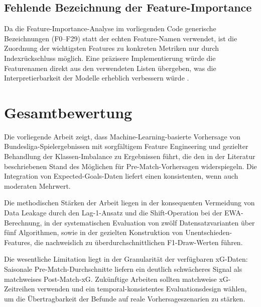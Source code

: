 \subsection{Fehlende Bezeichnung der Feature-Importance}

Da die Feature-Importance-Analyse im vorliegenden Code generische
Bezeichnungen (F0--F29) statt der echten Feature-Namen verwendet, ist
die Zuordnung der wichtigsten Features zu konkreten Metriken nur durch
Indexrückschluss möglich. Eine präzisere Implementierung würde die
Featurenamen direkt aus den verwendeten Listen übergeben, was die
Interpretierbarkeit der Modelle erheblich verbessern würde
\cite{LundbergLee2017}.

\section{Gesamtbewertung}
\label{sec:disk-zusammenfassung}

Die vorliegende Arbeit zeigt, dass Machine-Learning-basierte Vorhersage
von Bundesliga-Spielergebnissen mit sorgfältigem Feature Engineering
und gezielter Behandlung der Klassen-Imbalance zu Ergebnissen führt,
die den in der Literatur beschriebenen Stand des Möglichen für Pre-Match-Vorhersagen
widerspiegeln. Die Integration von Expected-Goals-Daten liefert einen
konsistenten, wenn auch moderaten Mehrwert.

Die methodischen Stärken der Arbeit liegen in der konsequenten
Vermeidung von Data Leakage durch den Lag-1-Ansatz und die Shift-Operation
bei der EWA-Berechnung, in der systematischen Evaluation von zwölf
Datensatzvarianten über fünf Algorithmen, sowie in der gezielten
Konstruktion von Unentschieden-Features, die nachweislich zu überdurchschnittlichen
F1-Draw-Werten führen.

Die wesentliche Limitation liegt in der Granularität der verfügbaren
xG-Daten: Saisonale Pre-Match-Durchschnitte liefern ein deutlich
schwächeres Signal als matchweises Post-Match-xG. Zukünftige Arbeiten
sollten matchweise xG-Zeitreihen verwenden und ein temporal-konsistentes
Evaluationsdesign wählen, um die Übertragbarkeit der Befunde auf
reale Vorhersageszenarien zu stärken.